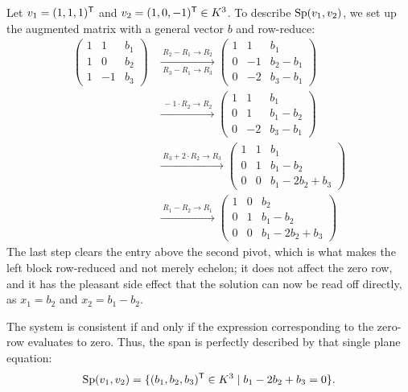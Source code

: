 \begin{example}
\label{ex:span_calc}
Let $v_{1} = (1, 1, 1)^{\mathsf{T}}$ and $v_{2} = (1, 0, -1)^{\mathsf{T}} \in K^{3}$. To describe $\operatorname{Sp}(v_{1}, v_{2})$, we set up the augmented matrix with a general vector $b$ and row-reduce:
\begin{align*}
\left( \begin{array}{cc|c} 1 & 1 & b_{1} \\ 1 & 0 & b_{2} \\ 1 & -1 & b_{3} \end{array} \right)
&\xrightarrow[\; R_{3} - R_{1} \to R_{3} \;]{\; R_{2} - R_{1} \to R_{2} \;}
\left( \begin{array}{cc|c} 1 & 1 & b_{1} \\ 0 & -1 & b_{2}-b_{1} \\ 0 & -2 & b_{3}-b_{1} \end{array} \right) \\[0.5em]
&\xrightarrow{\; -1 \cdot R_{2} \to R_{2} \;}
\left( \begin{array}{cc|c} 1 & 1 & b_{1} \\ 0 & 1 & b_{1}-b_{2} \\ 0 & -2 & b_{3}-b_{1} \end{array} \right) \\[0.5em]
&\xrightarrow{\;R_{3} + 2 \cdot R_{2} \to R_{3} \;}
\left( \begin{array}{cc|c} 1 & 1 & b_{1} \\ 0 & 1 & b_{1}-b_{2} \\ \hline 0 & 0 & b_{1}-2b_{2}+b_{3} \end{array} \right) \\[0.5em]
&\xrightarrow{\; R_{1} - R_{2} \to R_{1} \;}
\left( \begin{array}{cc|c} 1 & 0 & b_{2} \\ 0 & 1 & b_{1}-b_{2} \\ \hline 0 & 0 & b_{1}-2b_{2}+b_{3} \end{array} \right)
\end{align*}
The last step clears the entry above the second pivot, which is what makes the left block row-reduced and not merely echelon; it does not affect the zero row, and it has the pleasant side effect that the solution can now be read off directly, as $x_{1} = b_{2}$ and $x_{2} = b_{1} - b_{2}$.

The system is consistent if and only if the expression corresponding to the zero-row evaluates to zero. Thus, the span is perfectly described by that single plane equation:
\[
\operatorname{Sp}(v_{1}, v_{2}) = \{ (b_{1}, b_{2}, b_{3})^{\mathsf{T}} \in K^{3} \mid b_{1} - 2b_{2} + b_{3} = 0 \}.
\]
\end{example}

